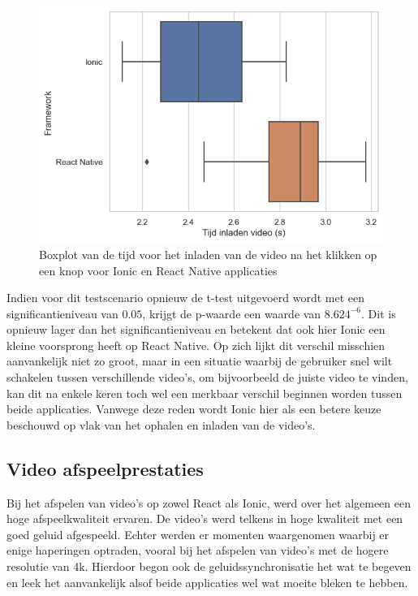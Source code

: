 \begin{figure}
  \centering
  \includegraphics[width=0.7\linewidth]{img/boxplotInteraction}
  \caption{Boxplot van de tijd voor het inladen van de video na het klikken op een knop voor Ionic en React Native applicaties}
  \label{fig:Boxplot van de tijd voor het inladen van de video na het klikken op een knop voor Ionic en React Native applicaties}
\end{figure}

Indien voor dit testscenario opnieuw de t-test uitgevoerd wordt met een significantieniveau van \(0.05\), krijgt de p-waarde een waarde van \(8.624^{-6}\). Dit is opnieuw lager dan het significantieniveau en betekent dat ook hier Ionic een kleine voorsprong heeft op React Native. Op zich lijkt dit verschil misschien aanvankelijk niet zo groot, maar in een situatie waarbij de gebruiker snel wilt schakelen tussen verschillende video's, om bijvoorbeeld de juiste video te vinden, kan dit na enkele keren toch wel een merkbaar verschil beginnen worden tussen beide applicaties. Vanwege deze reden wordt Ionic hier als een betere keuze beschouwd op vlak van het ophalen en inladen van de video's.


\subsection{Video afspeelprestaties}
\label{subsec:video-afspeelprestaties}

Bij het afspelen van video's op zowel React als Ionic, werd over het algemeen een hoge afspeelkwaliteit ervaren. De video's werd telkens in hoge kwaliteit met een goed geluid afgespeeld. Echter werden er momenten waargenomen waarbij er enige haperingen optraden, vooral bij het afspelen van video's met de hogere resolutie van 4k. Hierdoor begon ook de geluidssynchronisatie het wat te begeven en leek het aanvankelijk alsof beide applicaties wel wat moeite bleken te hebben.


